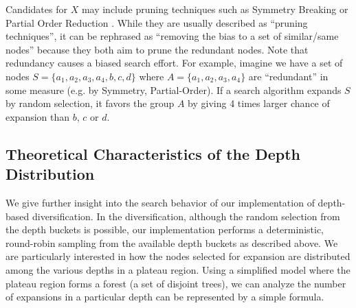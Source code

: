 Candidates for $X$ may
include pruning techniques such as Symmetry Breaking \cite{Fox1998,pochter2011exploiting,domshlak2013symmetry} or
Partial Order Reduction \cite{hall2013faster,wehrle2013relative}.
While they are usually described as ``pruning techniques'',
it can be rephrased as ``removing the bias to a set of similar/same nodes'' because
they both aim to prune the redundant nodes.
Note that redundancy causes a biased search effort. For example, imagine we have a
set of nodes $S=\{a_1, a_2, a_3, a_4, b, c, d\}$ where
$A=\{a_1, a_2, a_3, a_4\}$ are ``redundant'' in some measure (e.g. by Symmetry,
Partial-Order). 
If a search algorithm expands $S$ by random selection, it favors the
group $A$ by giving 4 times larger chance of expansion than $b$,
$c$ or $d$.

\subsection{Theoretical Characteristics of the Depth Distribution}
\label{sec:theoretical-characteristics}

We give further insight into the search behavior of our implementation of depth-based diversification.
In the diversification, although the random selection from the depth buckets is possible,
our implementation performs a deterministic, round-robin sampling from the available depth buckets as described above.
% 
We are particularly interested in how the nodes selected for expansion are distributed 
among the various depths in a plateau region.
Using a simplified model where the plateau region forms a forest (a set of disjoint trees),
we can analyze the number of expansions in a particular depth
can be represented by a simple formula. 



